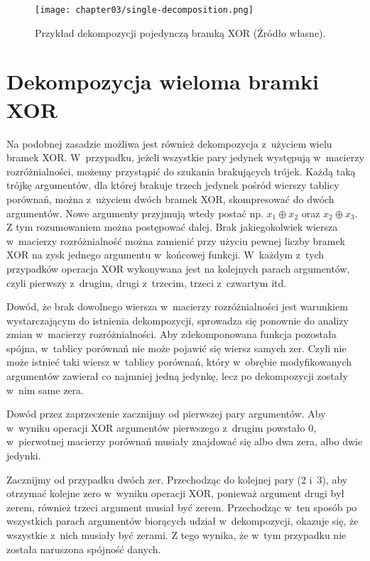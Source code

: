 \begin{figure}[H]
\centering
\texttt{[image: chapter03/single-decomposition.png]}
\caption{Przykład dekompozycji pojedynczą bramką XOR (Źródło własne).}
\end{figure}

\section{Dekompozycja wieloma bramki XOR}

Na podobnej zasadzie możliwa jest również dekompozycja z~użyciem wielu bramek XOR.
W~przypadku,
jeżeli wszystkie pary jedynek występują w~macierzy rozróżnialności,
możemy przystąpić do szukania brakujących trójek.
Każdą taką trójkę argumentów,
dla której brakuje trzech jedynek pośród wierszy tablicy porównań,
można z~użyciem dwóch bramek XOR,
skompresować do dwóch argumentów.
Nowe argumenty przyjmują wtedy postać np. $x_1 \oplus x_2$ oraz $x_2 \oplus x_3$.
Z tym rozumowaniem można postępować dalej.
Brak jakiegokolwiek wiersza w~macierzy rozróżnialność można zamienić przy użyciu pewnej liczby bramek XOR na zysk jednego argumentu w~końcowej funkcji.
W~każdym z~tych przypadków operacja XOR wykonywana jest na kolejnych parach argumentów,
czyli pierwszy z~drugim,
drugi z~trzecim,
trzeci z~czwartym itd.

Dowód,
że brak dowolnego wiersza w~macierzy rozróżnialności jest warunkiem wystarczającym do istnienia dekompozycji,
sprowadza się ponownie do analizy zmian w~macierzy rozróżnialności.
Aby zdekomponowana funkcja pozostała spójna,
w~tablicy porównań nie może pojawić się wiersz samych zer.
Czyli nie może istnieć taki wiersz w~tablicy porównań,
który w~obrębie modyfikowanych argumentów zawierał co najmniej jedną jedynkę,
lecz po dekompozycji zostały w~nim same zera.

Dowód przez zaprzeczenie zacznijmy od pierwszej pary argumentów.
Aby w~wyniku operacji XOR argumentów pierwszego z~drugim powstało 0,
w~pierwotnej macierzy porównań musiały znajdować się albo dwa zera,
albo dwie jedynki.

Zacznijmy od przypadku dwóch zer.
Przechodząc do kolejnej pary (2 i~3),
aby otrzymać kolejne zero w~wyniku operacji XOR,
ponieważ argument drugi był zerem,
również trzeci argument musiał być zerem.
Przechodząc w~ten sposób po wszystkich parach argumentów biorących udział w~dekompozycji,
okazuje się,
że wszystkie z~nich musiały być zerami.
Z tego wynika,
że w~tym przypadku nie została naruszona spójność danych.

